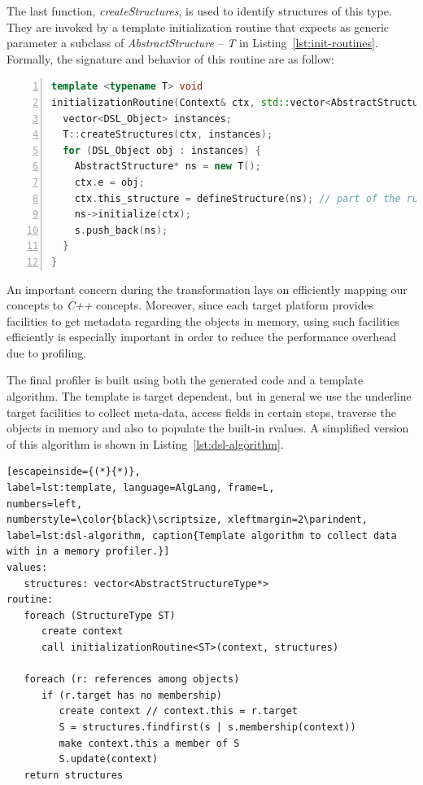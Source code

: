 The last function, \textit{createStructures}, is used to identify structures of this type.
They are invoked by a template initialization routine that expects as generic parameter a subclass of 
\textit{AbstractStructure} -- \textit{T} in Listing~\ref{lst:init-routines}.
Formally, the signature and behavior of this routine are as follow:
\begin{lstlisting}[language=C++, frame=L,
numbers=left,
numberstyle=\color{black}\scriptsize,xleftmargin=2\parindent,
label=lst:init-routines, caption={Routine to initialize structures in the heap.}]
template <typename T> void
initializationRoutine(Context& ctx, std::vector<AbstractStructure*>& s){
  vector<DSL_Object> instances;
  T::createStructures(ctx, instances);
  for (DSL_Object obj : instances) {
    AbstractStructure* ns = new T();
    ctx.e = obj;
    ctx.this_structure = defineStructure(ns); // part of the runtime support
    ns->initialize(ctx);
    s.push_back(ns);
  }
}
\end{lstlisting}
An important concern during the transformation lays on efficiently mapping our concepts to \textit{C++} concepts.
Moreover, since each target platform provides facilities to get metadata regarding the objects in memory, using such facilities efficiently is especially important in order to reduce the performance overhead due to profiling.

The final profiler is built using both the generated code and a template algorithm.
The template is target dependent, but in general we use the underline target facilities to collect meta-data, access fields in certain steps, traverse the objects in memory and also to populate the built-in rvalues.
A simplified version of this algorithm is shown in Listing~\ref{lst:dsl-algorithm}.

\begin{lstlisting}[escapeinside={(*}{*)},
label=lst:template, language=AlgLang, frame=L,
numbers=left,
numberstyle=\color{black}\scriptsize, xleftmargin=2\parindent,
label=lst:dsl-algorithm, caption{Template algorithm to collect data with in a memory profiler.}]
values:
   structures: vector<AbstractStructureType*>
routine:
   foreach (StructureType ST)
	  create context
	  call initializationRoutine<ST>(context, structures)
   
   foreach (r: references among objects)
      if (r.target has no membership)
         create context // context.this = r.target
         S = structures.findfirst(s | s.membership(context))
         make context.this a member of S
         S.update(context)
   return structures 
\end{lstlisting}

